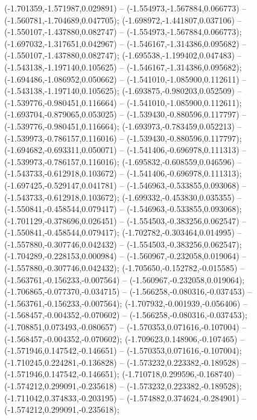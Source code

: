  (-1.701359,-1.571987,0.029891) -- (-1.554973,-1.567884,0.066773) -- (-1.560781,-1.704689,0.047705);
 (-1.698972,-1.441807,0.037106) -- (-1.550107,-1.437880,0.082747) -- (-1.554973,-1.567884,0.066773);
 (-1.697032,-1.317651,0.042967) -- (-1.546167,-1.314386,0.095682) -- (-1.550107,-1.437880,0.082747);
 (-1.695538,-1.199402,0.047483) -- (-1.543138,-1.197140,0.105625) -- (-1.546167,-1.314386,0.095682);
 (-1.694486,-1.086952,0.050662) -- (-1.541010,-1.085900,0.112611) -- (-1.543138,-1.197140,0.105625);
 (-1.693875,-0.980203,0.052509) -- (-1.539776,-0.980451,0.116664) -- (-1.541010,-1.085900,0.112611);
 (-1.693704,-0.879065,0.053025) -- (-1.539430,-0.880596,0.117797) -- (-1.539776,-0.980451,0.116664);
 (-1.693973,-0.783459,0.052213) -- (-1.539973,-0.786157,0.116016) -- (-1.539430,-0.880596,0.117797);
 (-1.694682,-0.693311,0.050071) -- (-1.541406,-0.696978,0.111313) -- (-1.539973,-0.786157,0.116016);
 (-1.695832,-0.608559,0.046596) -- (-1.543733,-0.612918,0.103672) -- (-1.541406,-0.696978,0.111313);
 (-1.697425,-0.529147,0.041781) -- (-1.546963,-0.533855,0.093068) -- (-1.543733,-0.612918,0.103672);
 (-1.699332,-0.453830,0.035355) -- (-1.550841,-0.458544,0.079417) -- (-1.546963,-0.533855,0.093068);
 (-1.701129,-0.378696,0.026451) -- (-1.554503,-0.383256,0.062547) -- (-1.550841,-0.458544,0.079417);
 (-1.702782,-0.303464,0.014995) -- (-1.557880,-0.307746,0.042432) -- (-1.554503,-0.383256,0.062547);
 (-1.704289,-0.228153,0.000984) -- (-1.560967,-0.232058,0.019064) -- (-1.557880,-0.307746,0.042432);
 (-1.705650,-0.152782,-0.015585) -- (-1.563761,-0.156233,-0.007564) -- (-1.560967,-0.232058,0.019064);
 (-1.706865,-0.077370,-0.034715) -- (-1.566258,-0.080316,-0.037453) -- (-1.563761,-0.156233,-0.007564);
 (-1.707932,-0.001939,-0.056406) -- (-1.568457,-0.004352,-0.070602) -- (-1.566258,-0.080316,-0.037453);
 (-1.708851,0.073493,-0.080657) -- (-1.570353,0.071616,-0.107004) -- (-1.568457,-0.004352,-0.070602);
 (-1.709623,0.148906,-0.107465) -- (-1.571946,0.147542,-0.146651) -- (-1.570353,0.071616,-0.107004);
 (-1.710245,0.224281,-0.136828) -- (-1.573232,0.223382,-0.189528) -- (-1.571946,0.147542,-0.146651);
 (-1.710718,0.299596,-0.168740) -- (-1.574212,0.299091,-0.235618) -- (-1.573232,0.223382,-0.189528);
 (-1.711042,0.374833,-0.203195) -- (-1.574882,0.374624,-0.284901) -- (-1.574212,0.299091,-0.235618);
